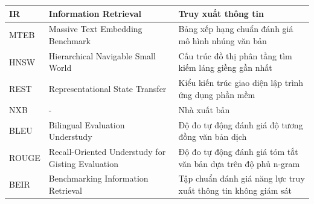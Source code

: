 \begin{longtable}{|l|l|p{7.5cm}|}
    \hline
    IR & Information Retrieval & Truy xuất thông tin \\
    \hline
    MTEB & Massive Text Embedding Benchmark & Bảng xếp hạng chuẩn đánh giá mô hình nhúng văn bản \\
    \hline
    HNSW & Hierarchical Navigable Small World & Cấu trúc đồ thị phân tầng tìm kiếm láng giềng gần nhất \\
    \hline
    REST & Representational State Transfer & Kiểu kiến trúc giao diện lập trình ứng dụng phần mềm \\
    \hline
    NXB & - & Nhà xuất bản \\
    \hline
    BLEU & Bilingual Evaluation Understudy & Độ đo tự động đánh giá độ tương đồng văn bản dịch \\
    \hline
    ROUGE & Recall-Oriented Understudy for Gisting Evaluation & Độ đo tự động đánh giá tóm tắt văn bản dựa trên độ phủ n-gram \\
    \hline
    BEIR & Benchmarking Information Retrieval & Tập chuẩn đánh giá năng lực truy xuất thông tin không giám sát \\
    \hline
\end{longtable}
